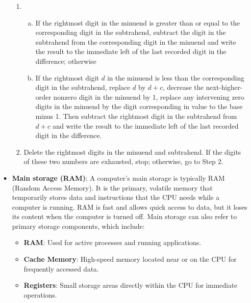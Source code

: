 \documentclass{report}
\begin{document}
\begin{itemize}
\begin{enumerate}
                \item \begin{enumerate}[(a)]
                        \item If the rightmost digit in the minuend is greater than or equal 
                            to the corresponding digit in the subtrahend, subtract the digit in 
                            the subtrahend from the corresponding digit in the minuend and 
                            write the result to the immediate left of the last recorded digit in 
                            the difference; otherwise
                        \item If the rightmost digit \(d\) in the minuend is less than the 
                            corresponding digit in the subtrahend, replace \(d\) by \(d + c\), decrease the 
                            next-higher-order nonzero digit in the minuend by 1, replace any 
                            intervening zero digits in the minuend by the digit corresponding in 
                            value to the base minus 1. Then subtract the rightmost digit in the 
                            subtrahend from \(d + c\) and write the result to the immediate left of 
                            the last recorded digit in the difference.
                    \end{enumerate}
            \item Delete the rightmost digits in the minuend and subtrahend. If the digits of these two numbers are exhausted, stop; otherwise, go to Step 2.
            \end{enumerate}
        \item \textbf{Main storage (RAM)}: A computer's main storage is typically RAM (Random Access Memory). It is the primary, volatile memory that temporarily stores data and instructions that the CPU needs while a computer is running. RAM is fast and allows quick access to data, but it loses its content when the computer is turned off.
            \bigbreak \noindent 
            Main storage can also refer to primary storage components, which include:
            \begin{itemize}
                \item \textbf{RAM}: Used for active processes and running applications.
                \item \textbf{Cache Memory}: High-speed memory located near or on the CPU for frequently accessed data.
                \item \textbf{Registers}: Small storage areas directly within the CPU for immediate operations.

\end{itemize}
\end{itemize}
\end{document}
